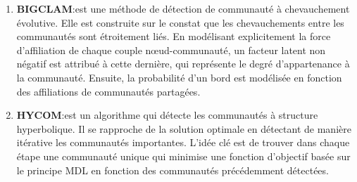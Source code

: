 \begin{enumerate}
				\item \textbf{BIGCLAM\citep{yang2013overlapping}}:est une méthode de détection de communauté à chevauchement évolutive. Elle est construite sur le constat que les chevauchements entre les communautés sont étroitement liés. En modélisant explicitement la force d’affiliation de chaque couple nœud-communauté, un facteur latent non négatif est attribué à cette dernière, qui représente le degré d'appartenance à la communauté. Ensuite, la probabilité d'un bord est modélisée en fonction des affiliations de communautés partagées.
				\item \textbf{HYCOM\citep{araujo2014beyond}}:est un algorithme qui détecte les communautés à structure hyperbolique. Il se rapproche de la solution optimale en détectant de manière itérative les communautés importantes. L'idée clé est de trouver dans chaque étape une communauté unique qui minimise une fonction d'objectif basée sur le principe MDL en fonction des communautés précédemment détectées. 
				
			\end{enumerate}
			
